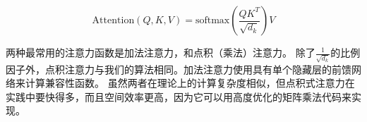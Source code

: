 \begin{equation}
   \mathrm{Attention}(Q, K, V) = \mathrm{softmax}\left(\frac{QK^T}{\sqrt{d_k}}\right)V
\end{equation}


两种最常用的注意力函数是加法注意力\citep{bahdanau2014neural}，和点积（乘法）注意力。 除了$\frac{1}{\sqrt{d_k}}$的比例因子外，点积注意力与我们的算法相同。加法注意力使用具有单个隐藏层的前馈网络来计算兼容性函数。 虽然两者在理论上的计算复杂度相似，但点积式注意力在实践中要快得多，而且空间效率更高，因为它可以用高度优化的矩阵乘法代码来实现。





